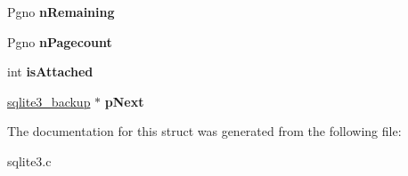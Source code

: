\begin{DoxyCompactItemize}
\item 
Pgno {\bfseries n\+Remaining}\hypertarget{structsqlite3__backup_a4287faa23d4534e8a33915740604d1e1}{}\label{structsqlite3__backup_a4287faa23d4534e8a33915740604d1e1}

\item 
Pgno {\bfseries n\+Pagecount}\hypertarget{structsqlite3__backup_a98599d5a3a13173a6a126242d1fbbaa8}{}\label{structsqlite3__backup_a98599d5a3a13173a6a126242d1fbbaa8}

\item 
int {\bfseries is\+Attached}\hypertarget{structsqlite3__backup_af515f0d9265847d820cbaad41cef78ae}{}\label{structsqlite3__backup_af515f0d9265847d820cbaad41cef78ae}

\item 
\hyperlink{structsqlite3__backup}{sqlite3\+\_\+backup} $\ast$ {\bfseries p\+Next}\hypertarget{structsqlite3__backup_a3a87332e045fe4a477fe262409c6011a}{}\label{structsqlite3__backup_a3a87332e045fe4a477fe262409c6011a}

\end{DoxyCompactItemize}


The documentation for this struct was generated from the following file\+:\begin{DoxyCompactItemize}
\item 
sqlite3.\+c\end{DoxyCompactItemize}
